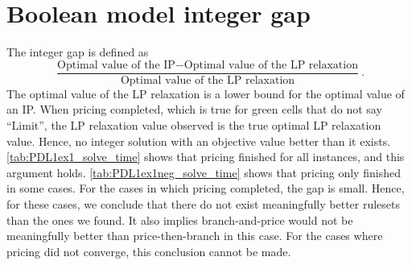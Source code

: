\section{Boolean model integer gap}\label{sec:boolean_model_appendix}

The integer gap is defined as
\[
    \frac{\text{Optimal value of the IP} - \text{Optimal value of the LP relaxation}}{\text{Optimal value of the LP relaxation}}.
\]
The optimal value of the LP relaxation is a lower bound for the optimal value of an IP\@.
When pricing completed, which is true for green cells that do not say ``Limit'',
the LP relaxation value observed is the true optimal LP relaxation value.
Hence, no integer solution with an objective value better than it exists.
\autoref{tab:PDL1ex1_solve_time} shows that pricing finished for all instances, and this argument holds.
\autoref{tab:PDL1ex1neg_solve_time} shows that pricing only finished in some cases.
For the cases in which pricing completed, the gap is small.
Hence, for these cases, we conclude that there do not exist meaningfully better rulesets than the ones we found.
It also implies branch-and-price would not be meaningfully better than price-then-branch in this case.
For the cases where pricing did not converge, this conclusion cannot be made.

\begin{table}
    
    \caption{Integer gap for the boolean model on the full Broad dataset for various $\nq$ and $Q_y$,
        only lower-bounds}
    \label{tab:PDL1ex1_solve_time}
\end{table}

\begin{table}
    
    \caption{Integer gap for the boolean model on the full Broad dataset for various $\nq$ and $Q_y$,
        both lower-bounds and upper-bounds}
    \label{tab:PDL1ex1neg_solve_time}
\end{table}


%    
%
%    


